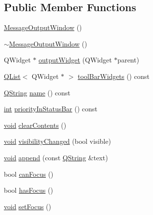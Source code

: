 \subsection*{Public Member Functions}
\begin{DoxyCompactItemize}
\item 
\hyperlink{group___core_plugin_ga5e3eee057a8fc9f116f9cec5bb51ba0d}{Message\-Output\-Window} ()
\item 
\hyperlink{group___core_plugin_gafbe2484cac096ccb3fe637fdba3a163e}{$\sim$\-Message\-Output\-Window} ()
\item 
Q\-Widget $\ast$ \hyperlink{group___core_plugin_ga978c79305cbaabe74f6569035fb4369e}{output\-Widget} (Q\-Widget $\ast$parent)
\item 
\hyperlink{class_q_list}{Q\-List}$<$ Q\-Widget $\ast$ $>$ \hyperlink{group___core_plugin_gacc1af51900b4902f2dd63640107ff14e}{tool\-Bar\-Widgets} () const 
\item 
\hyperlink{group___u_a_v_objects_plugin_gab9d252f49c333c94a72f97ce3105a32d}{Q\-String} \hyperlink{group___core_plugin_ga77ee2886510c6915930d1825f3186b54}{name} () const 
\item 
\hyperlink{ioapi_8h_a787fa3cf048117ba7123753c1e74fcd6}{int} \hyperlink{group___core_plugin_ga23ebc377d471fd9d98481a19d0554d50}{priority\-In\-Status\-Bar} () const 
\item 
\hyperlink{group___u_a_v_objects_plugin_ga444cf2ff3f0ecbe028adce838d373f5c}{void} \hyperlink{group___core_plugin_ga7e8265ade5df23729e5c595d422d7422}{clear\-Contents} ()
\item 
\hyperlink{group___u_a_v_objects_plugin_ga444cf2ff3f0ecbe028adce838d373f5c}{void} \hyperlink{group___core_plugin_ga009be0f4be24f547f0670a5ac63b458c}{visibility\-Changed} (bool visible)
\item 
\hyperlink{group___u_a_v_objects_plugin_ga444cf2ff3f0ecbe028adce838d373f5c}{void} \hyperlink{group___core_plugin_gaf547a10d779b7f71fd4d16295b55ac6a}{append} (const \hyperlink{group___u_a_v_objects_plugin_gab9d252f49c333c94a72f97ce3105a32d}{Q\-String} \&text)
\item 
bool \hyperlink{group___core_plugin_gac6b3dcfb20703e83a37a97925fa6934d}{can\-Focus} ()
\item 
bool \hyperlink{group___core_plugin_ga8c332418cc91754e54d188abd1126357}{has\-Focus} ()
\item 
\hyperlink{group___u_a_v_objects_plugin_ga444cf2ff3f0ecbe028adce838d373f5c}{void} \hyperlink{group___core_plugin_gaba73b1a517e47415a365697fcae21645}{set\-Focus} ()
\item 

\end{DoxyCompactItemize}

